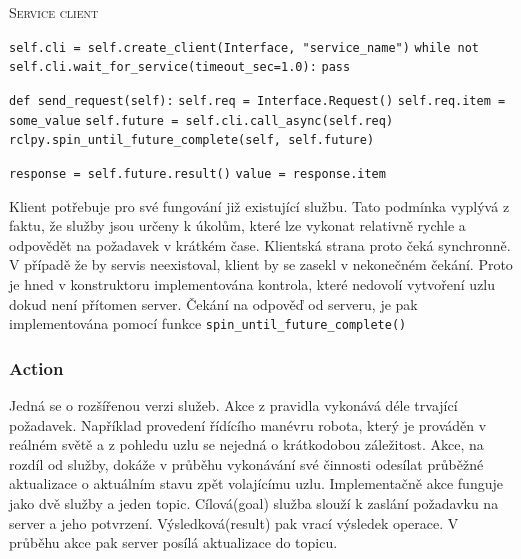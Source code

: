 \begin{algorithm}[h!]
	\label{}
	\caption{\textsc{Service client}}
	
	\DontPrintSemicolon
	\SetAlgoNoLine
	\SetNlSty{}{}{:}
	\SetNlSkip{-1.1em}
	
	\BlankLine \Indp\Indpp
	
	\texttt{self.cli = self.create\_client(Interface, "service\_name")}\;
	\texttt{while not self.cli.wait\_for\_service(timeout\_sec=1.0):}\;
	\Indp\Indp
	\texttt{pass}\;
	\Indm\Indm

	\BlankLine
	\texttt{def send\_request(self):}\;
	\Indp\Indp
	\texttt{self.req = Interface.Request()}\;
	\texttt{self.req.item = some\_value}\;
	\texttt{self.future = self.cli.call\_async(self.req)}\;
	\texttt{rclpy.spin\_until\_future\_complete(self, self.future)}\;
	
	\BlankLine
	\texttt{response = self.future.result()}\;
	\texttt{value = response.item}\;
\end{algorithm}

Klient potřebuje pro své fungování již existující službu. Tato podmínka vyplývá z faktu, že služby jsou určeny k úkolům, které lze vykonat relativně rychle a odpovědět na požadavek v krátkém čase. Klientská strana proto čeká synchronně. V případě že by servis neexistoval, klient by se zasekl v nekonečném čekání. Proto je hned v konstruktoru implementována kontrola, které nedovolí vytvoření uzlu dokud není přítomen server. Čekání na odpověď od serveru, je pak implementována pomocí funkce \verb|spin_until_future_complete()| \cite{ros2_documentation}

\newpage
\subsubsection*{Action}
Jedná se o rozšířenou verzi služeb. Akce z pravidla vykonává déle trvající požadavek. Například provedení řídícího manévru robota, který je prováděn v reálném světě a z pohledu uzlu se nejedná o krátkodobou záležitost. Akce, na rozdíl od služby, dokáže v průběhu vykonávání své činnosti odesílat průběžné aktualizace o aktuálním stavu zpět volajícímu uzlu. Implementačně akce funguje jako dvě služby a jeden topic. Cílová(goal) služba slouží k zaslání požadavku na server a jeho potvrzení. Výsledková(result) pak vrací výsledek operace. V průběhu akce pak server posílá aktualizace do topicu. \cite{ros2_introduction}

